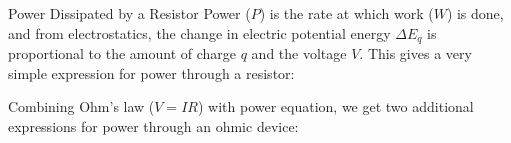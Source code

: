 \documentclass[12pt,aspectratio=169]{beamer}
\begin{document}
%
%
%



\begin{frame}{Power Dissipated by a Resistor}
  Power ($P$) is the rate at which work ($W$) is done, and from electrostatics,
  the change in electric potential energy $\Delta E_q$ is proportional to the
  amount of charge $q$ and the voltage $V$. This gives a very simple expression
  for power through a resistor:
  

  Combining Ohm's law ($V=IR$) with power equation, we get two additional
  expressions for power through an ohmic device:

\end{frame}
\end{document}
